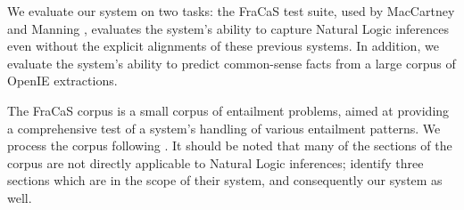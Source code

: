 We evaluate our system on two tasks: the FraCaS test suite, used
  by MacCartney and Manning ,
  evaluates the system's ability to capture Natural Logic inferences
  even without the explicit alignments of these previous systems.
In addition, we evaluate the system's ability to predict common-sense
  facts from a large corpus of OpenIE extractions.

%
%
The FraCaS corpus \cite{key:1996cooper-fracas}
  is a small corpus of entailment problems, aimed at providing a
  comprehensive test of a system's handling of various
  entailment patterns.
We process the corpus following .
It should be noted that many of the sections of the corpus
  are not directly applicable to Natural Logic inferences;
   identify three sections which
  are in the scope of their system, and consequently our system as well.

